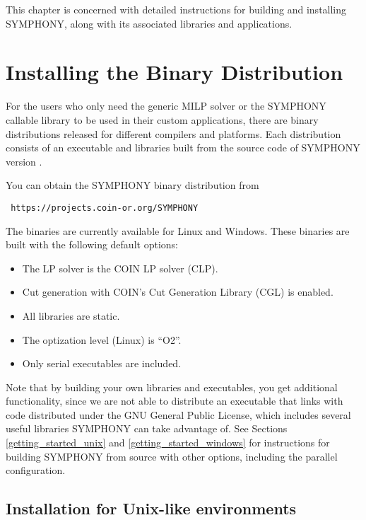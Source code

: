 This chapter is concerned with detailed instructions for building and
installing SYMPHONY, along with its associated libraries and applications.

\section{Installing the Binary Distribution}

For the users who only need the generic MILP solver or the SYMPHONY 
callable library to be used in their custom applications, there are 
binary distributions released for different compilers and platforms. 
Each distribution consists of an executable and libraries built from the 
source code of SYMPHONY version \VER.
 
You can obtain the SYMPHONY binary distribution from 
{\color{Brown}
\begin{verbatim}
 https://projects.coin-or.org/SYMPHONY
\end{verbatim}
}

The binaries are currently available for Linux and Windows. These binaries are
built with the following default options:
\begin{itemize}
\item The LP solver is the COIN LP solver (CLP).
\item Cut generation with COIN's Cut Generation Library (CGL) is enabled.
\item All libraries are static.
\item The optization level (Linux) is ``O2''. 
\item Only serial executables are included.
\end{itemize} 

Note that by building your own libraries and executables, you get additional
functionality, since we are not able to distribute an executable that links
with code distributed under the GNU General Public License, which includes
several useful libraries SYMPHONY can take advantage of. See Sections
\ref{getting_started_unix} and \ref{getting_started_windows} for instructions
for building SYMPHONY from source with other options, including the parallel
configuration.

\subsection{Installation for Unix-like environments}
\label{building-unix}

